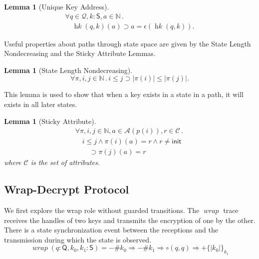 \documentclass[12pt]{article}
\newtheorem{lem}[thm]{Lemma}
\newcommand{\fn}[1]{\ensuremath{\operatorname{\mathit{#1}}}}
\newcommand{\srt}[1]{\ensuremath{\mathsf{#1}}}
\newcommand{\typ}{\mathbin:}
\newcommand{\enc}[2]{\ensuremath{\{\!|#1|\!\}_{#2}}}
\newcommand{\inbnd}{\mathord -}
\newcommand{\outbnd}{\mathord +}
\newcommand{\neutral}{\mathord\circ}
\newcommand{\nat}{\ensuremath{\mathbb{N}}}
\newcommand{\all}[1]{\forall#1\mathpunct.}
\newcommand{\sta}{\ensuremath{\mathcal{Q}}}
\newcommand{\pth}{\ensuremath{\pi}}
\newcommand{\addr}{\ensuremath{\mathcal{A}}}
\newcommand{\attr}{\ensuremath{\mathcal{C}}}
\newcommand{\ainit}{\ensuremath{\mathsf{init}}}
\begin{document}
\begin{lem}[Unique Key Address]\label{lem:epsilon}
\[
\begin{array}{l}
\all{q\in\sta,k\typ\srt{S},a\in\nat}\\
\quad\fn{hk}(q,k)(a)\supset a=\epsilon(\fn{hk}(q, k)).
\end{array}
\]
\end{lem}

Useful properties about paths through state space are given by the
State Length Nondecreasing and the Sticky Attribute Lemmas.


\begin{lem}[State Length Nondecreasing]\label{lem:nondecreasing}
\[
\all{\pth,i,j\in\nat}i\leq j
\supset|\pth(i)|\leq|\pth(j)|.
\]
\end{lem}

This lemma is used to show that when a key exists in a state in a
path, it will exists in all later states.


\begin{lem}[Sticky Attribute]\label{lem:sticky attribute}
\[
\begin{array}{l}
\all{\pth,i,j\in\nat, a\in\addr(p(i)), r\in\attr}\\
\quad i\leq j\land\pth(i)(a) = r\land r\neq\ainit\\
\qquad{}\supset\pth(j)(a)=r
\end{array}
\]
where {\attr} is the set of attributes.
\end{lem}

\subsection{Wrap-Decrypt Protocol}\label{sec:wrap-decryt protocol}

We first explore the wrap role without guarded transitions.  The
\fn{wrap} trace receives the handles of two keys and transmits the
encryption of one by the other.  There is a state synchronization
event between the receptions and the transmission during which the
state is observed.
%
\[\fn{wrap}(q\typ\srt{Q},k_0,k_1\typ\srt{S})=
\inbnd\#k_0\Rightarrow\inbnd\#k_1\Rightarrow
\neutral(q,q)\Rightarrow\outbnd\enc{k_0}{k_1}\]
\end{document}
